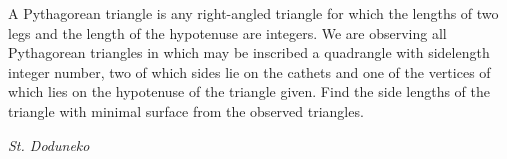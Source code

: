 A Pythagorean triangle is any right-angled triangle for which the lengths of two legs and the length of the hypotenuse are integers. We are observing all Pythagorean triangles in which may be inscribed a quadrangle with sidelength integer number, two of which sides lie on the cathets and one of the vertices of which lies on the hypotenuse of the triangle given. Find the side lengths of the triangle with minimal surface from the observed triangles.

\textit{St. Doduneko}